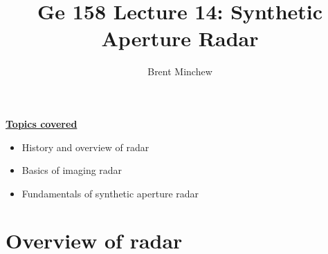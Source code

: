 \documentclass[11pt, oneside]{article}
\title{Ge 158 Lecture 14: Synthetic Aperture Radar}
\author{Brent Minchew}
\date{}
\begin{document}
\maketitle

\noindent\underline{\textbf{Topics covered}}
\begin{itemize}
	\item History and overview of radar
	\item Basics of imaging radar
	\item Fundamentals of synthetic aperture radar
\end{itemize}

\section{Overview of radar}
\label{s:overview}
\end{document}
